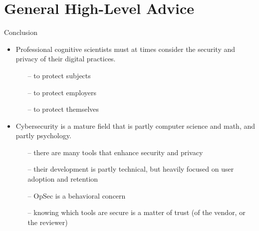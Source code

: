 \documentclass[aspectratio=169]{beamer}
\begin{document}
\section{General High-Level Advice}

\begin{frame}{Conclusion}
\begin{itemize}
  \item Professional cognitive scientists must at times consider the security and privacy of their digital practices. 
  \begin{itemize}
    \item[--] to protect subjects
    \item[--] to protect employers
    \item[--] to protect themselves
  \end{itemize}
  \item Cybersecurity is a mature field that is partly computer science and math, and partly psychology. 
  \begin{itemize}
    \item[--] there are many tools that enhance security and privacy
    \item[--] their development is partly technical, but heavily focused on user adoption and retention
    \item[--] OpSec is a behavioral concern
    \item[--] knowing which tools are secure is a matter of trust (of the vendor, or the reviewer)
  \end{itemize}
\end{itemize}
\end{frame}
\end{document}

